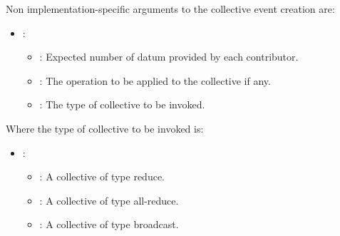 Non implementation-specific arguments to the collective event creation are:
\begin{itemize}
\item {}:
\begin{itemize}
\item {}: Expected number of datum provided by each contributor.
\item {}: The operation to be applied to the collective if any.
\item {}: The type of collective to be invoked.
\end{itemize}
\end{itemize}

Where the type of collective to be invoked is:
\begin{itemize}
\item {}:
\begin{itemize}
\item {}: A collective of type reduce.
\item {}: A collective of type all-reduce.
\item {}: A collective of type broadcast.
\end{itemize}
\end{itemize}

